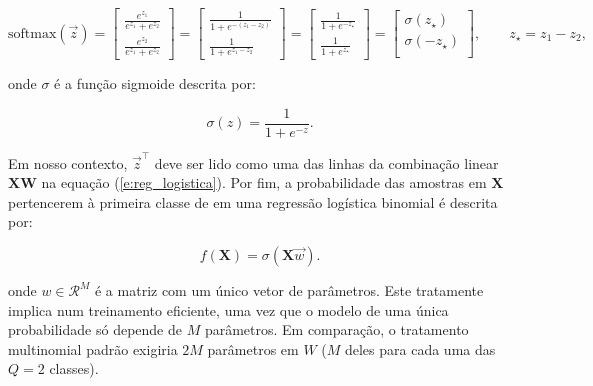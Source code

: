     \begin{equation} \label{e:softmax_binomial}
      \text{softmax}(\vec{z}) =
      \begin{bmatrix}
        \frac{e^{z_1}}{e^{z_1} + e^{z_2}} \\
        \frac{e^{z_2}}{e^{z_1} + e^{z_2}}
      \end{bmatrix} =
      \begin{bmatrix}
        \frac{1}{1 + e^{-(z_1-z_2)}} \\
        \frac{1}{1 + e^{z_1-z_2}}
      \end{bmatrix} =
      \begin{bmatrix}
        \frac{1}{1 + e^{-z_\star}} \\
        \frac{1}{1 + e^{z_\star}}
      \end{bmatrix} =
      \begin{bmatrix}
        \sigma(z_\star) \\
        \sigma(-z_\star) \\
      \end{bmatrix}, \qquad z_\star = z_1-z_2
      ,
    \end{equation}

    \noindent onde $\sigma$ é a função sigmoide descrita por:

    \begin{equation} \label{e:sigmoid}
      \sigma(z) = \frac{1}{1+e^{-z}}
      .
    \end{equation}

    \noindent Em nosso contexto, $\vec{z}^\top$ deve ser lido como uma das linhas da combinação linear $\boldsymbol{X}\boldsymbol{W}$ na equação (\ref{e:reg_logistica}). Por fim, a probabilidade das amostras em $\boldsymbol{X}$ pertencerem à primeira classe de em uma regressão logística binomial é descrita por:

    \begin{equation} \label{e:reg_logistica_binomial}
      f(\boldsymbol{X}) = \sigma \left( \boldsymbol{X} \vec{w} \right)
      .
    \end{equation}

    \noindent onde $w \in \mathcal{R}^{M}$ é a matriz com um único vetor de parâmetros. Este tratamente implica num treinamento eficiente, uma vez que o modelo de uma única probabilidade só depende de $M$ parâmetros. Em comparação, o tratamento multinomial padrão exigiria $2M$ parâmetros em $W$ ($M$ deles para cada uma das $Q=2$ classes).

